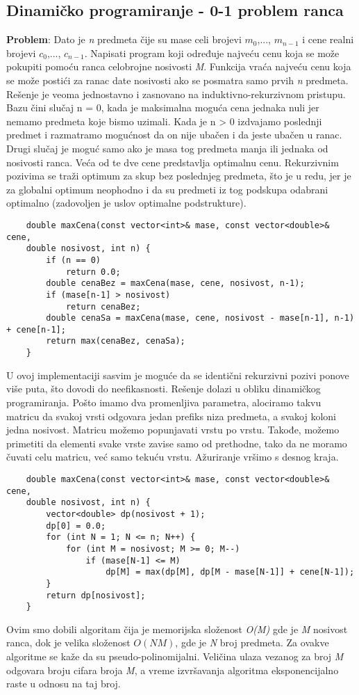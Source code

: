 \documentclass{article}
\begin{document}
\subsection{Dinamičko programiranje - 0-1 problem ranca}
\textbf{Problem}: Dato je \textit{n} predmeta čije su mase celi brojevi $m_0$,..., $m_{n-1}$ i cene
realni brojevi $c_0$,..., $c_{n-1}$. Napisati program koji određuje najveću cenu koja
se može pokupiti pomoću ranca celobrojne nosivosti \textit{M}.
\newline
Funkcija vraća najveću cenu koja se može postići za
ranac date nosivosti ako se posmatra samo prvih \textit{n} predmeta. Rešenje je veoma
jednostavno i zasnovano na induktivno-rekurzivnom pristupu. Bazu čini slučaj
n = 0, kada je maksimalna moguća cena jednaka nuli jer nemamo predmeta
koje bismo uzimali. Kada je n > 0 izdvajamo poslednji predmet i razmatramo
mogućnost da on nije ubačen i da jeste ubačen u ranac. Drugi slučaj je moguć samo ako je masa tog predmeta manja ili jednaka od nosivosti ranca. Veća od te
dve cene predstavlja optimalnu cenu. Rekurzivnim pozivima se traži optimum
za skup bez poslednjeg predmeta, što je u redu, jer je za globalni optimum
neophodno i da su predmeti iz tog podskupa odabrani optimalno (zadovoljen je
uslov optimalne podstrukture).
\begin{lstlisting}
    double maxCena(const vector<int>& mase, const vector<double>& cene, 
    double nosivost, int n) {
        if (n == 0)
            return 0.0;
        double cenaBez = maxCena(mase, cene, nosivost, n-1);
        if (mase[n-1] > nosivost)
            return cenaBez;
        double cenaSa = maxCena(mase, cene, nosivost - mase[n-1], n-1) + cene[n-1];
        return max(cenaBez, cenaSa);
    }
\end{lstlisting}
U ovoj implementaciji sasvim je moguće da se identični rekurzivni pozivi ponove
više puta, što dovodi do neefikasnosti. Rešenje dolazi u obliku dinamičkog programiranja. Pošto imamo dva promenljiva parametra, alociramo takvu matricu da
svakoj vrsti odgovara jedan prefiks niza predmeta, a svakoj koloni jedna nosivost.
Matricu možemo popunjavati vrstu po vrstu. Takođe, možemo primetiti da
elementi svake vrste zavise samo od prethodne, tako da ne moramo čuvati celu
matricu, već samo tekuću vrstu. Ažuriranje vršimo s desnog kraja.
\begin{lstlisting}
    double maxCena(const vector<int>& mase, const vector<double>& cene,
    double nosivost, int n) {
        vector<double> dp(nosivost + 1);
        dp[0] = 0.0;
        for (int N = 1; N <= n; N++) {
            for (int M = nosivost; M >= 0; M--)
                if (mase[N-1] <= M)
                    dp[M] = max(dp[M], dp[M - mase[N-1]] + cene[N-1]);
        }
        return dp[nosivost];
    }
\end{lstlisting}
Ovim smo dobili algoritam čija je memorijska složenost \textit{O(M)} gde je \textit{M} nosivost
ranca, dok je velika složenost $O(NM)$, gde je \textit{N} broj predmeta. Za ovakve algoritme se kaže da su pseudo-polinomijalni. Veličina
ulaza vezanog za broj \textit{M} odgovara broju cifara broja \textit{M}, a vreme izvršavanja algoritma eksponencijalno
raste u odnosu na taj broj.
\end{document}
